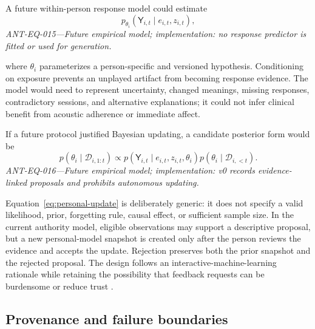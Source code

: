 A future within-person response model could estimate
\begin{equation}
  p_{\theta_i}\!\left(
    \mathsf{Y}_{i,t}
    \mid e_{i,t},z_{i,t}
  \right),
  \label{eq:response-model}
\end{equation}
\noindent\textit{ANT-EQ-015---Future empirical model; implementation: no
response predictor is fitted or used for generation.}

where $\theta_i$ parameterizes a person-specific and versioned hypothesis.
Conditioning on exposure prevents an unplayed artifact from becoming response
evidence. The model would need to represent uncertainty, changed meanings,
missing responses, contradictory sessions, and alternative explanations; it
could not infer clinical benefit from acoustic adherence or immediate affect.

If a future protocol justified Bayesian updating, a candidate posterior form
would be
\begin{equation}
  p\!\left(\theta_i\mid\mathcal{D}_{i,1:t}\right)
  \propto
  p\!\left(
    \mathsf{Y}_{i,t}
    \mid e_{i,t},z_{i,t},\theta_i
  \right)
  p\!\left(\theta_i\mid\mathcal{D}_{i,<t}\right).
  \label{eq:personal-update}
\end{equation}
\noindent\textit{ANT-EQ-016---Future empirical model; implementation: v0
records evidence-linked proposals and prohibits autonomous updating.}

Equation~\ref{eq:personal-update} is deliberately generic: it does not specify
a valid likelihood, prior, forgetting rule, causal effect, or sufficient sample
size. In the current authority model, eligible observations may support a
descriptive proposal, but a new personal-model snapshot is created only after
the person reviews the evidence and accepts the update. Rejection preserves
both the prior snapshot and the rejected proposal. The design follows an
interactive-machine-learning rationale while retaining the possibility that
feedback requests can be burdensome or reduce trust
\citep{amershi2014interactive,honeycutt2020feedback}.


\subsection{Provenance and failure boundaries}
\label{sec:design-provenance-failures}


